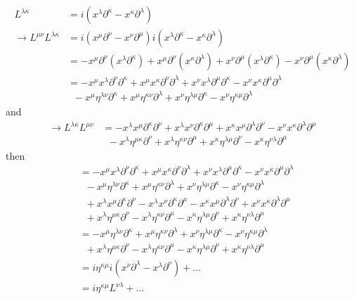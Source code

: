 \documentclass[../main.tex]{subfiles}
\begin{document}
\begin{enumerate}[a)]
\begin{align}
L^{\lambda\kappa}&=i(x^\lambda\partial^\kappa-x^\kappa\partial^\lambda)\\
\rightarrow L^{\mu\nu}L^{\lambda\kappa}
&=i(x^\mu\partial^\nu-x^\nu\partial^\mu)i(x^\lambda\partial^\kappa-x^\kappa\partial^\lambda)\\
&=-x^\mu\partial^\nu(x^\lambda\partial^\kappa) +x^\mu\partial^\nu(x^\kappa\partial^\lambda)
+x^\nu\partial^\mu(x^\lambda\partial^\kappa)
-x^\nu\partial^\mu(x^\kappa\partial^\lambda)\\
&=-x^\mu x^\lambda\partial^\nu\partial^\kappa
+x^\mu x^\kappa\partial^\nu\partial^\lambda
+x^\nu x^\lambda\partial^\mu\partial^\kappa
-x^\nu x^\kappa\partial^\mu\partial^\lambda\\
&\;\;-x^\mu \eta^{\lambda\nu}\partial^\kappa
+x^\mu \eta^{\kappa\nu}\partial^\lambda
+x^\nu \eta^{\lambda\mu}\partial^\kappa
-x^\nu \eta^{\kappa\mu}\partial^\lambda
\end{align}
and
\begin{align}
\rightarrow L^{\lambda\kappa}L^{\mu\nu}
&=-x^\lambda x^\mu\partial^\kappa\partial^\nu
+x^\lambda x^\nu\partial^\kappa\partial^\mu
+x^\kappa x^\mu\partial^\lambda\partial^\nu
-x^\nu x^\kappa\partial^\lambda\partial^\mu\\
&\;\;-x^\lambda \eta^{\mu\kappa}\partial^\nu
+x^\lambda \eta^{\kappa\nu}\partial^\mu
+x^\kappa \eta^{\lambda\mu}\partial^\nu
-x^\kappa \eta^{\nu\lambda}\partial^\mu
\end{align}
then
\begin{align}
[L^{\mu\nu},L^{\lambda\kappa}]
&=-x^\mu x^\lambda\partial^\nu\partial^\kappa
+x^\mu x^\kappa\partial^\nu\partial^\lambda
+x^\nu x^\lambda\partial^\mu\partial^\kappa
-x^\nu x^\kappa\partial^\mu\partial^\lambda\\
&\;\;-x^\mu \eta^{\lambda\nu}\partial^\kappa
+x^\mu \eta^{\kappa\nu}\partial^\lambda
+x^\nu \eta^{\lambda\mu}\partial^\kappa
-x^\nu \eta^{\kappa\mu}\partial^\lambda\\
&\;\;+x^\lambda x^\mu\partial^\kappa\partial^\nu
-x^\lambda x^\nu\partial^\kappa\partial^\mu
-x^\kappa x^\mu\partial^\lambda\partial^\nu
+x^\nu x^\kappa\partial^\lambda\partial^\mu\\
&\;\;+x^\lambda \eta^{\mu\kappa}\partial^\nu
-x^\lambda \eta^{\kappa\nu}\partial^\mu
-x^\kappa \eta^{\lambda\mu}\partial^\nu
+x^\kappa \eta^{\nu\lambda}\partial^\mu\\
&=-x^\mu \eta^{\lambda\nu}\partial^\kappa
+x^\mu \eta^{\kappa\nu}\partial^\lambda
+x^\nu \eta^{\lambda\mu}\partial^\kappa
-x^\nu \eta^{\kappa\mu}\partial^\lambda\\
&\;\;+x^\lambda \eta^{\mu\kappa}\partial^\nu
-x^\lambda \eta^{\kappa\nu}\partial^\mu
-x^\kappa \eta^{\lambda\mu}\partial^\nu
+x^\kappa \eta^{\nu\lambda}\partial^\mu\\
&=i\eta^{\kappa\mu}i(x^\nu\partial^\lambda-x^\lambda\partial^\nu)+...\\
&=i\eta^{\kappa\mu}L^{\nu\lambda}+...\\
\end{align}

\end{enumerate}
\end{document}
